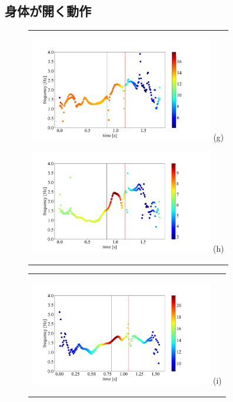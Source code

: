\subsection{身体が開く動作}
\begin{figure}
    \begin{center}
        \begin{tabular}{c}
            \begin{minipage}{0.5\hsize}
                \begin{center}
                    \includegraphics[width=8cm]{./images/straight_data/left_up_leg/IMF4.png}
                    (g)
                \end{center}
            \end{minipage}

            \begin{minipage}{0.5\hsize}
                \begin{center}
                    \includegraphics[width=8cm]{./images/straight_data/left_leg/IMF4.png}
                    (h)
                \end{center}
            \end{minipage}
        \end{tabular}
    \end{center}

    \begin{center}
        \begin{tabular}{c}
            \begin{minipage}{0.5\hsize}
                \begin{center}
                    \includegraphics[width=8cm]{./images/opening_data/left_up_leg/IMF4.png}
                    (i)
                \end{center}
            \end{minipage}


\end{tabular}
\end{center}
\end{figure}
